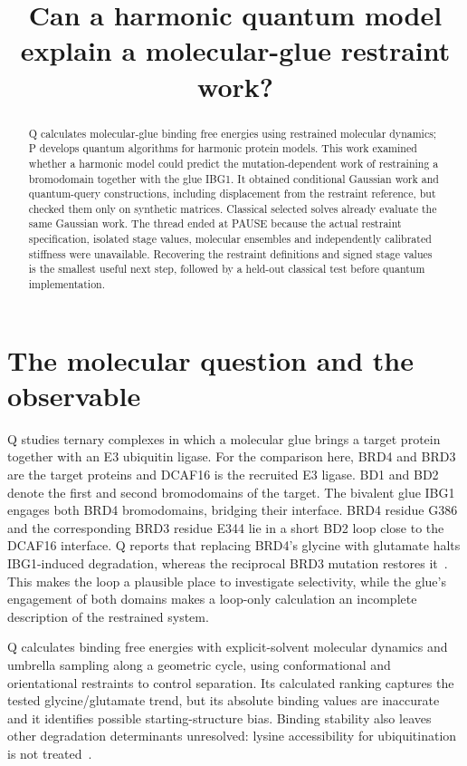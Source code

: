 \documentclass{article}
\title{Can a harmonic quantum model explain a molecular-glue restraint work?}
\begin{document}
\maketitle
\begin{abstract}
Q calculates molecular-glue binding free energies using restrained molecular dynamics; P develops quantum algorithms for harmonic protein models. This work examined whether a harmonic model could predict the mutation-dependent work of restraining a bromodomain together with the glue IBG1. It obtained conditional Gaussian work and quantum-query constructions, including displacement from the restraint reference, but checked them only on synthetic matrices. Classical selected solves already evaluate the same Gaussian work. The thread ended at PAUSE because the actual restraint specification, isolated stage values, molecular ensembles and independently calibrated stiffness were unavailable. Recovering the restraint definitions and signed stage values is the smallest useful next step, followed by a held-out classical test before quantum implementation.
\end{abstract}

\section{The molecular question and the observable}

Q studies ternary complexes in which a molecular glue brings a target protein together with an E3 ubiquitin ligase. For the comparison here, BRD4 and BRD3 are the target proteins and DCAF16 is the recruited E3 ligase. BD1 and BD2 denote the first and second bromodomains of the target. The bivalent glue IBG1 engages both BRD4 bromodomains, bridging their interface. BRD4 residue G386 and the corresponding BRD3 residue E344 lie in a short BD2 loop close to the DCAF16 interface. Q reports that replacing BRD4's glycine with glutamate halts IBG1-induced degradation, whereas the reciprocal BRD3 mutation restores it~\cite{Q}. This makes the loop a plausible place to investigate selectivity, while the glue's engagement of both domains makes a loop-only calculation an incomplete description of the restrained system.

Q calculates binding free energies with explicit-solvent molecular dynamics and umbrella sampling along a geometric cycle, using conformational and orientational restraints to control separation. Its calculated ranking captures the tested glycine/glutamate trend, but its absolute binding values are inaccurate and it identifies possible starting-structure bias. Binding stability also leaves other degradation determinants unresolved: lysine accessibility for ubiquitination is not treated~\cite{Q}.
\end{document}
